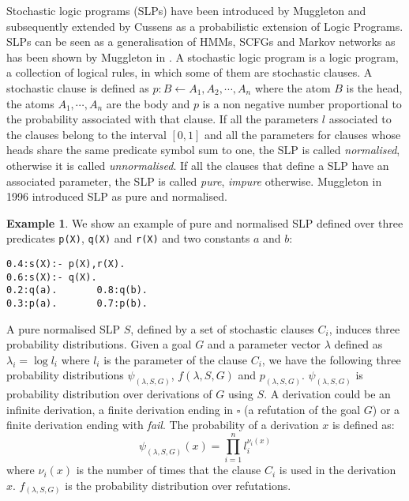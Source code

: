 \documentclass[letterpaper]{article}
\theoremstyle{plain}
\theoremstyle{definition}
\theoremstyle{remark}
\theoremstyle{definition}
\newtheorem{example}{Example}[section]
\begin{document}
Stochastic logic programs (SLPs) have been introduced by Muggleton \cite{SLPmuggleton96} and subsequently extended by Cussens \cite{SLPcussens2000} as a probabilistic extension of Logic Programs. SLPs can be seen as a generalisation of HMMs, SCFGs and Markov networks as has been shown by Muggleton in \cite{SLPmuggleton96}.
A stochastic logic program is a logic program, a collection of logical rules, in which some of them are stochastic clauses.
A stochastic clause is defined as $p: B \leftarrow A_1, A_2, \cdots, A_n$ where the atom $B$ is the head, the atoms $A_1, \cdots , A_n$ are the body and $p$ is a non negative number proportional to the probability associated with that clause.
If all the parameters $l$ associated to the clauses belong to the interval $[0,1]$ and all the parameters for clauses whose heads share the same predicate symbol sum to one, the SLP is called \emph{normalised}, otherwise it is called \emph{unnormalised}. 
If all the clauses that define a SLP have an associated parameter, the SLP is called \emph{pure}, \emph{impure} otherwise. Muggleton in 1996 \cite{SLPmuggleton96} introduced SLP as pure and normalised.
\begin{example}
We show an example of pure and normalised SLP defined over three predicates \lstinline{p(X)}, \lstinline{q(X)} and \lstinline{r(X)} and two constants $a$ and $b$:

\begin{lstlisting}[mathescape=true]
0.4:s(X):- p(X),r(X).
0.6:s(X):- q(X).
0.2:q(a).		0.8:q(b).
0.3:p(a).		0.7:p(b).
 \end{lstlisting}

\end{example}
A pure normalised SLP $S$, defined by a set of stochastic clauses $C_i$, induces three probability distributions. Given a goal $G$ and a parameter vector $\lambda$ defined as $\lambda_i= \log l_i$ where $l_i$ is the parameter of the clause $C_i$, we have the following three probability distributions $\psi_{(\lambda,S,G)}$, $f(\lambda,S,G)$ and $p_{(\lambda,S,G)}$. 
$\psi_{(\lambda,S,G)}$ is probability distribution over derivations of $G$ using $S$. A derivation could be an infinite derivation, a finite derivation ending in $\square$ (a refutation of the goal $G$) or a finite derivation ending with \emph{fail}. The probability of a derivation $x$ is defined as:
$$ \psi_{(\lambda,S,G)}(x)= \prod_{i=1}^n l_i^{\nu_i(x)}$$
where $\nu_i(x)$ is the number of times that the clause $C_i$ is used in the derivation $x$.
$f_{(\lambda,S,G)}$ is the probability distribution over refutations.
\end{document}
